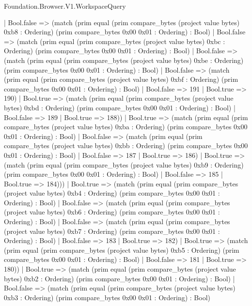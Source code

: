 \begin{lexlean}{Foundation.Browser.V1.WorkspaceQuery}
\begin{semanticmodule}
{            | Bool.false => (match (prim equal (prim compare_bytes (project value bytes) 0xb8 : Ordering) (prim compare_bytes 0x00 0x01 : Ordering) : Bool)
              | Bool.false => (match (prim equal (prim compare_bytes (project value bytes) 0xbc : Ordering) (prim compare_bytes 0x00 0x01 : Ordering) : Bool)
                | Bool.false => (match (prim equal (prim compare_bytes (project value bytes) 0xbe : Ordering) (prim compare_bytes 0x00 0x01 : Ordering) : Bool)
                  | Bool.false => (match (prim equal (prim compare_bytes (project value bytes) 0xbf : Ordering) (prim compare_bytes 0x00 0x01 : Ordering) : Bool)
                    | Bool.false => 191
                    | Bool.true => 190)
                  | Bool.true => (match (prim equal (prim compare_bytes (project value bytes) 0xbd : Ordering) (prim compare_bytes 0x00 0x01 : Ordering) : Bool)
                    | Bool.false => 189
                    | Bool.true => 188))
                | Bool.true => (match (prim equal (prim compare_bytes (project value bytes) 0xba : Ordering) (prim compare_bytes 0x00 0x01 : Ordering) : Bool)
                  | Bool.false => (match (prim equal (prim compare_bytes (project value bytes) 0xbb : Ordering) (prim compare_bytes 0x00 0x01 : Ordering) : Bool)
                    | Bool.false => 187
                    | Bool.true => 186)
                  | Bool.true => (match (prim equal (prim compare_bytes (project value bytes) 0xb9 : Ordering) (prim compare_bytes 0x00 0x01 : Ordering) : Bool)
                    | Bool.false => 185
                    | Bool.true => 184)))
              | Bool.true => (match (prim equal (prim compare_bytes (project value bytes) 0xb4 : Ordering) (prim compare_bytes 0x00 0x01 : Ordering) : Bool)
                | Bool.false => (match (prim equal (prim compare_bytes (project value bytes) 0xb6 : Ordering) (prim compare_bytes 0x00 0x01 : Ordering) : Bool)
                  | Bool.false => (match (prim equal (prim compare_bytes (project value bytes) 0xb7 : Ordering) (prim compare_bytes 0x00 0x01 : Ordering) : Bool)
                    | Bool.false => 183
                    | Bool.true => 182)
                  | Bool.true => (match (prim equal (prim compare_bytes (project value bytes) 0xb5 : Ordering) (prim compare_bytes 0x00 0x01 : Ordering) : Bool)
                    | Bool.false => 181
                    | Bool.true => 180))
                | Bool.true => (match (prim equal (prim compare_bytes (project value bytes) 0xb2 : Ordering) (prim compare_bytes 0x00 0x01 : Ordering) : Bool)
                  | Bool.false => (match (prim equal (prim compare_bytes (project value bytes) 0xb3 : Ordering) (prim compare_bytes 0x00 0x01 : Ordering) : Bool)
}
\end{semanticmodule}
\end{lexlean}
